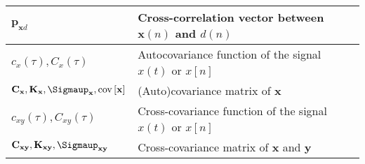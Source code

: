 \documentclass{article}
\begin{document}
\begin{xltabular}{\textwidth}{XX}
	\(\mathbf{p}_{\mathbf{x}d}\)                                                                                                  & Cross-correlation vector between \(\mathbf{x}(n)\) and \(d(n)\) \cite{dinizAdaptiveFiltering1997}                                                                                                                                  \\ \hline
	\(c_x(\tau), C_x(\tau)\)                                                                                                      & Autocovariance function of the signal \(x(t)\) or \(x[n]\) \cite{nossekAdaptiveArraySignal2015}                                                                                                                                    \\ \hline
	\(\mathbf{C}_\mathbf{x}, \mathbf{K}_\mathbf{x}, \boldsymbol{\Sigmaup}_\mathbf{x}, \textnormal{cov}\left[ \mathbf{x} \right]\) & (Auto)covariance matrix of \(\mathbf{x}\) \cite{vantreesOptimumArrayProcessing2002,proakisDigitalCommunications2007,leon-garciaProbabilityStatisticsRandom2007,haykinAdaptiveFilterTheory2002,bishopPatternRecognitionMachine2006} \\ \hline
	\(c_{xy}(\tau), C_{xy}(\tau)\)                                                                                                & Cross-covariance function of the signal \(x(t)\) or \(x[n]\) \cite{nossekAdaptiveArraySignal2015}                                                                                                                                  \\ \hline
	\(\mathbf{C}_{\mathbf{xy}}, \mathbf{K}_{\mathbf{xy}}, \boldsymbol{\Sigmaup}_{\mathbf{xy}}\)                                   & Cross-covariance matrix of \(\mathbf{x}\) and \(\mathbf{y}\)
\end{xltabular}
\end{document}
